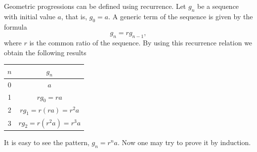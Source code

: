 Geometric progressions can be defined using recurrence. Let $g_n$ be a sequence with
initial value $a$, that is, $g_0=a$. A generic term of the sequence is given by
the formula
$$
g_n=rg_{n-1},
$$
where $r$ is the common ratio of the sequence. By using this recurrence relation
we obtain the following results
\begin{center}
\begin{tabular}{|c|c|}
\hline
$n$ & $g_n$\\
\hline
0 & $a$\\
\hline
1 & $rg_0=ra$\\
\hline
2 & $rg_1=r(ra)=r^2a$\\
\hline
3 & $rg_2=r(r^2a)=r^3a$\\
\hline
\end{tabular}
\end{center}
It is easy to see the pattern, $g_n=r^na$. Now one may try to prove it by induction.

